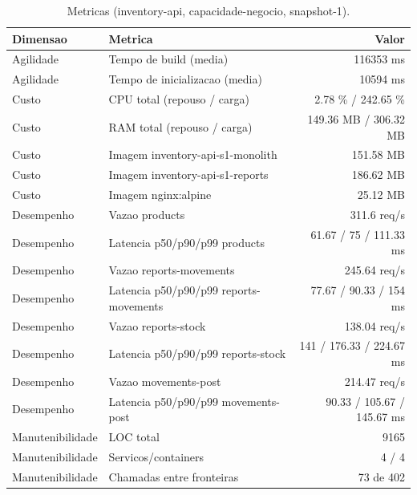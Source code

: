 \begin{table}[htb]
  \centering
  \caption{Metricas (inventory-api, capacidade-negocio, snapshot-1).}
  \label{tab:metricas-inventory-api-capacidade-negocio-snapshot-1}
  \begin{tabular}{llr}
    \hline
    \textbf{Dimensao} & \textbf{Metrica} & \textbf{Valor} \\
    \hline
    Agilidade & Tempo de build (media) & 116353 ms \\
    Agilidade & Tempo de inicializacao (media) & 10594 ms \\
    Custo & CPU total (repouso / carga) & 2.78 \% / 242.65 \% \\
    Custo & RAM total (repouso / carga) & 149.36 MB / 306.32 MB \\
    Custo & Imagem inventory-api-s1-monolith & 151.58 MB \\
    Custo & Imagem inventory-api-s1-reports & 186.62 MB \\
    Custo & Imagem nginx:alpine & 25.12 MB \\
    Desempenho & Vazao products & 311.6 req/s \\
    Desempenho & Latencia p50/p90/p99 products & 61.67 / 75 / 111.33 ms \\
    Desempenho & Vazao reports-movements & 245.64 req/s \\
    Desempenho & Latencia p50/p90/p99 reports-movements & 77.67 / 90.33 / 154 ms \\
    Desempenho & Vazao reports-stock & 138.04 req/s \\
    Desempenho & Latencia p50/p90/p99 reports-stock & 141 / 176.33 / 224.67 ms \\
    Desempenho & Vazao movements-post & 214.47 req/s \\
    Desempenho & Latencia p50/p90/p99 movements-post & 90.33 / 105.67 / 145.67 ms \\
    Manutenibilidade & LOC total & 9165 \\
    Manutenibilidade & Servicos/containers & 4 / 4 \\
    Manutenibilidade & Chamadas entre fronteiras & 73 de 402 \\
    \hline
  \end{tabular}
\end{table}
